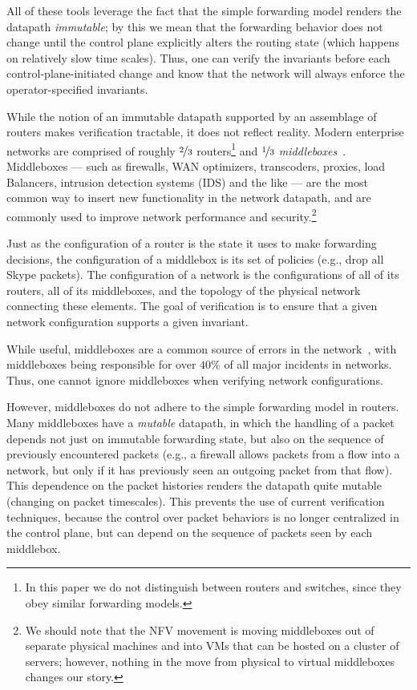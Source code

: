 All of these tools leverage the fact that the simple forwarding model renders the datapath {\em immutable}; by this we mean that the forwarding behavior does not change until the control plane explicitly alters the routing state (which happens on relatively slow time scales). Thus, one can verify the invariants before each control-plane-initiated change and know that the network will always enforce the operator-specified invariants.

While the notion of an immutable datapath supported by an assemblage of routers makes verification tractable, it does not reflect reality. Modern enterprise networks are comprised of roughly $\nicefrac{2}{3}$ routers\footnote{In this paper we do not distinguish between routers and switches, since they obey similar forwarding models.} and $\nicefrac{1}{3}$ {\em middleboxes}~\cite{sherry2012making}.  Middleboxes --- such as firewalls, WAN optimizers, transcoders, proxies, load Balancers, intrusion detection systems (IDS) and the like --- are the most common way to insert new functionality in the network datapath, and are commonly used to improve network performance and security.\footnote{We should note that the NFV movement is moving middleboxes out of separate physical machines and into VMs that can be hosted on a cluster of servers; however, nothing in the move from physical to virtual middleboxes changes our story.} 

Just as the configuration of a router is the state it uses to make forwarding decisions, the configuration of a middlebox is its set of policies (e.g., drop all Skype packets). The configuration of a network is the configurations of all of its routers, all of its middleboxes, and the topology of the physical network connecting these elements. The goal of verification is to ensure that a given network configuration supports a given invariant.

While useful, middleboxes are a common source of errors in the network~\cite{potharaju2013demystifying}, with middleboxes 
being responsible for over $40\%$ of all major
incidents in networks. Thus, one cannot ignore middleboxes when verifying network configurations.

However, middleboxes do not adhere to the simple forwarding model in routers. Many middleboxes have a {\em mutable} datapath, in which the handling of a packet depends not just on immutable forwarding state, but also on the sequence of previously encountered packets (e.g., a firewall allows packets from a flow into a network, but only if it has previously seen an outgoing packet from that flow).  This dependence on the packet histories renders the datapath quite mutable (changing on packet timescales). This prevents the use of current verification techniques, because the control over packet behaviors is no longer centralized in the control plane, but can depend on the sequence of packets seen by each middlebox.


